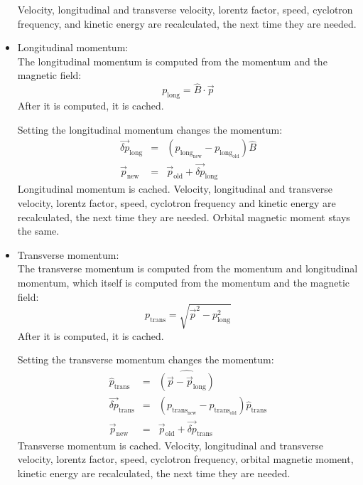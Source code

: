 \begin{itemize}
		Velocity, longitudinal and transverse velocity, lorentz factor, speed, cyclotron frequency, and kinetic energy are recalculated, the next time they are needed.
    
		\item Longitudinal momentum:\\ 
		The longitudinal momentum is computed from the momentum and the magnetic field:
		\begin{equation}
			p_{\mathrm{long}} = \hat{B} \cdot \vec{p}
		\end{equation}
		After it is computed, it is cached.
		
		Setting the longitudinal momentum changes the momentum:
		\begin{eqnarray}
			\vec{\delta p}_{\mathrm{long}} &=& \left(p_{\mathrm{long}_{\mathrm{new}}} - p_{\mathrm{long}_{\mathrm{old}}} \right) \hat{B} \\
			\vec{p}_{\mathrm{new}} &=& \vec{p}_{\mathrm{old}} + \vec{\delta p}_{\mathrm{long}}   
		\end{eqnarray}
		Longitudinal momentum is cached. Velocity, longitudinal and transverse velocity, lorentz factor, speed, cyclotron frequency and kinetic energy are recalculated, the next time they are needed. Orbital magnetic moment stays the same.
		
		\item Transverse momentum:\\
		The transverse momentum is computed from the momentum and longitudinal momentum, which itself is computed from the momentum and the magnetic field:
		\begin{equation}
			p_{\mathrm{trans}} = \sqrt{\vec{p}^2 - p_{\mathrm{long}}^2}
		\end{equation}
		After it is computed, it is cached.    

		Setting the transverse momentum changes the momentum:
		\begin{eqnarray}
			\hat{p}_{\mathrm{trans}} &=& \hat{ \left( \vec{p} - \vec{p}_{\mathrm{long}} \right )}\\
			\vec{\delta p}_{\mathrm{trans}} &=& \left( p_{\mathrm{trans}_{\mathrm{new}}} - p_{\mathrm{trans}_{\mathrm{old}}} \right) \hat{p}_{\mathrm{trans}} \\
			\vec{p}_{\mathrm{new}} &=& \vec{p}_{\mathrm{old}}  +  \vec{\delta p}_{\mathrm{trans}}    
		\end{eqnarray}
		Transverse momentum is cached.
		Velocity, longitudinal and transverse velocity, lorentz factor, speed, cyclotron frequency, orbital magnetic moment, kinetic energy are recalculated, the next time they are needed. 


\end{itemize}
